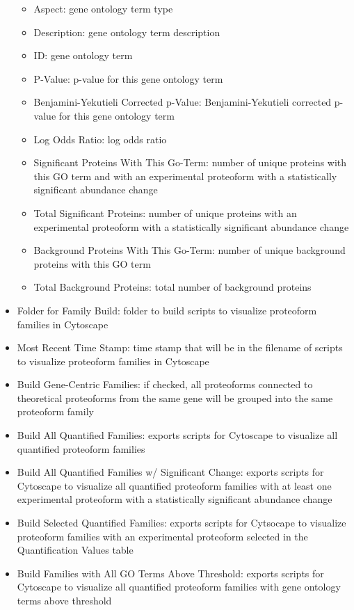 \begin{itemize}
\begin{figure}[h]
\end{figure}
\begin{itemize}
\item Aspect: gene ontology term type
\item Description: gene ontology term description
\item ID: gene ontology term
\item P-Value: p-value for this gene ontology term
\item Benjamini-Yekutieli Corrected p-Value: Benjamini-Yekutieli corrected p-value for this gene ontology term
\item Log Odds Ratio: log odds ratio
\item Significant Proteins With This Go-Term: number of unique proteins with this GO term and with an experimental proteoform with a statistically significant abundance change
\item Total Significant Proteins: number of unique proteins with an experimental proteoform with a statistically significant abundance change
\item Background Proteins With This Go-Term: number of unique background proteins with this GO term
\item Total Background Proteins: total number of background proteins
\end{itemize}
\item Folder for Family Build: folder to build scripts to visualize proteoform families in Cytoscape
\item Most Recent Time Stamp: time stamp that will be in the filename of scripts to visualize proteoform families in Cytoscape
\item Build Gene-Centric Families: if checked, all proteoforms connected to theoretical proteoforms from the same gene will be grouped into the same proteoform family
\item Build All Quantified Families: exports scripts for Cytoscape to visualize all quantified proteoform families
\item Build All Quantified Families w/ Significant Change: exports scripts for Cytoscape to visualize all quantified proteoform families with at least one experimental proteoform with a statistically significant abundance change
\item Build Selected Quantified Families: exports scripts for Cytsocape to visualize proteoform families with an experimental proteoform selected in the Quantification Values table
\item Build Families with All GO Terms Above Threshold: exports scripts for Cytoscape to visualize all quantified proteoform families with gene ontology terms above threshold

\end{itemize}
